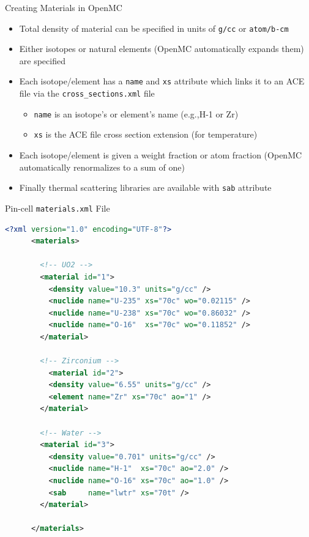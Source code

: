 \documentclass[serif]{beamer}
\begin{document}
\begin{frame}{Creating Materials in OpenMC}

  \begin{itemize}
    \item<1-> Total density of material can be specified in units of 
              \texttt{g/cc} or \texttt{atom/b-cm}\vfill
    \item<1-> Either isotopes or natural elements (OpenMC automatically expands them)
              are specified
    \item<1-> Each isotope/element has a \texttt{\color{darkblue}name} and \texttt{\color{darkblue}xs} attribute 
              which links it to an ACE file via the \texttt{cross\_sections.xml} file
      \begin{itemize}
        \item<1-> \texttt{\color{darkblue}name} is an isotope's or element's name (e.g.,H-1 or Zr)
        \item<1-> \texttt{\color{darkblue}xs} is the ACE file cross section extension (for temperature)
      \end{itemize}
    \vfill
    \item<1-> Each isotope/element is given a weight fraction or atom fraction
              (OpenMC automatically renormalizes to a sum of one) \vfill
    \item<1-> Finally thermal scattering libraries are available with \texttt{\color{darkblue}sab} attribute
    \vfill
  \end{itemize}

\end{frame}


\begin{frame}[fragile]{Pin-cell \texttt{materials.xml} File}
  \vfill
  \begin{scriptsize}
    \begin{lstlisting}[language=XML]
      <?xml version="1.0" encoding="UTF-8"?>
      <materials>

        <!-- UO2 -->
        <material id="1">
          <density value="10.3" units="g/cc" />
          <nuclide name="U-235" xs="70c" wo="0.02115" />
          <nuclide name="U-238" xs="70c" wo="0.86032" />
          <nuclide name="O-16"  xs="70c" wo="0.11852" />
        </material>

        <!-- Zirconium -->
          <material id="2">
          <density value="6.55" units="g/cc" />
          <element name="Zr" xs="70c" ao="1" />
        </material>

        <!-- Water -->
        <material id="3">
          <density value="0.701" units="g/cc" />
          <nuclide name="H-1"  xs="70c" ao="2.0" />
          <nuclide name="O-16" xs="70c" ao="1.0" />
          <sab     name="lwtr" xs="70t" />
        </material>

      </materials>
    \end{lstlisting}
  \end{scriptsize}
  \vfill
\end{frame}
\end{document}
